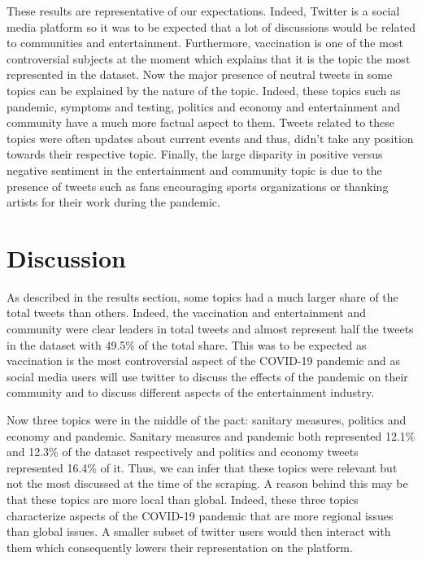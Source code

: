 \documentclass[letterpaper]{article} %
\begin{document}
These results are representative of our expectations. Indeed, Twitter is a social media platform so it was to be expected that a lot of discussions would be related to communities and entertainment. Furthermore, vaccination is one of the most controversial subjects at the moment which explains that it is the topic the most represented in the dataset. Now the major presence of neutral tweets in some topics can be explained by the nature of the topic. Indeed, these topics such as pandemic, symptoms and testing, politics and economy and entertainment and community have a much more factual aspect to them. Tweets related to these topics were often updates about current events and thus, didn't take any position towards their respective topic. Finally, the large disparity in positive versus negative sentiment in the entertainment and community topic is due to the presence of tweets such as fans encouraging sports organizations or thanking artists for their work during the pandemic.

\section{Discussion}



As described in the results section, some topics had a much larger share of the total tweets than others. Indeed, the vaccination and entertainment and community were clear leaders in total tweets and almost represent half the tweets in the dataset with 49.5\% of the total share. This was to be expected as vaccination is the most controversial aspect of the COVID-19 pandemic and as social media users will use twitter to discuss the effects of the pandemic on their community and to discuss different aspects of the entertainment industry. 

Now three topics were in the middle of the pact: sanitary measures, politics and economy and pandemic. Sanitary measures and pandemic both represented 12.1\% and 12.3\% of the dataset respectively and politics and economy tweets represented 16.4\% of it. Thus, we can infer that these topics were relevant but not the most discussed at the time of the scraping. A reason behind this may be that these topics are more local than global. Indeed, these three topics characterize aspects of the COVID-19 pandemic that are more regional issues than global issues. A smaller subset of twitter users would then interact with them which consequently lowers their representation on the platform. 
\end{document}
